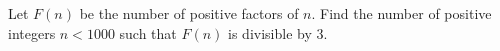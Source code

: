 Let $F(n)$ be the number of positive factors of $n$. Find the number of positive integers $n<1000$ such that $F(n)$ is divisible by $3$.
